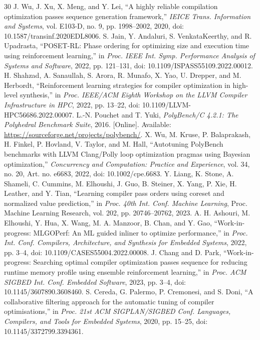 \begin{thebibliography}{30}
 J. Wu, J. Xu, X. Meng, and Y. Lei, ``A highly reliable compilation optimization passes sequence generation framework,'' \textit{IEICE Trans. Information and Systems}, vol. E103-D, no. 9, pp. 1998--2002, 2020, doi: 10.1587/transinf.2020EDL8006.
 S. Jain, Y. Andaluri, S. VenkataKeerthy, and R. Upadrasta, ``POSET-RL: Phase ordering for optimizing size and execution time using reinforcement learning,'' in \textit{Proc. IEEE Int. Symp. Performance Analysis of Systems and Software}, 2022, pp. 121--131, doi: 10.1109/ISPASS55109.2022.00012.
 H. Shahzad, A. Sanaullah, S. Arora, R. Munafo, X. Yao, U. Drepper, and M. Herbordt, ``Reinforcement learning strategies for compiler optimization in high-level synthesis,'' in \textit{Proc. IEEE/ACM Eighth Workshop on the LLVM Compiler Infrastructure in HPC}, 2022, pp. 13--22, doi: 10.1109/LLVM-HPC56686.2022.00007.
 L.-N. Pouchet and T. Yuki, \textit{PolyBench/C 4.2.1: The Polyhedral Benchmark Suite}, 2016. [Online]. Available: \url{https://sourceforge.net/projects/polybench/}.
 X. Wu, M. Kruse, P. Balaprakash, H. Finkel, P. Hovland, V. Taylor, and M. Hall, ``Autotuning PolyBench benchmarks with LLVM Clang/Polly loop optimization pragmas using Bayesian optimization,'' \textit{Concurrency and Computation: Practice and Experience}, vol. 34, no. 20, Art. no. e6683, 2022, doi: 10.1002/cpe.6683.
 Y. Liang, K. Stone, A. Shameli, C. Cummins, M. Elhoushi, J. Guo, B. Steiner, X. Yang, P. Xie, H. Leather, and Y. Tian, ``Learning compiler pass orders using coreset and normalized value prediction,'' in \textit{Proc. 40th Int. Conf. Machine Learning}, Proc. Machine Learning Research, vol. 202, pp. 20746--20762, 2023.
 A. H. Ashouri, M. Elhoushi, Y. Hua, X. Wang, M. A. Manzoor, B. Chan, and Y. Gao, ``Work-in-progress: MLGOPerf: An ML guided inliner to optimize performance,'' in \textit{Proc. Int. Conf. Compilers, Architecture, and Synthesis for Embedded Systems}, 2022, pp. 3--4, doi: 10.1109/CASES55004.2022.00008.
 J. Chang and D. Park, ``Work-in-progress: Searching optimal compiler optimization passes sequence for reducing runtime memory profile using ensemble reinforcement learning,'' in \textit{Proc. ACM SIGBED Int. Conf. Embedded Software}, 2023, pp. 3--4, doi: 10.1145/3607890.3608460.
 S. Cereda, G. Palermo, P. Cremonesi, and S. Doni, ``A collaborative filtering approach for the automatic tuning of compiler optimisations,'' in \textit{Proc. 21st ACM SIGPLAN/SIGBED Conf. Languages, Compilers, and Tools for Embedded Systems}, 2020, pp. 15--25, doi: 10.1145/3372799.3394361.

\end{thebibliography}

